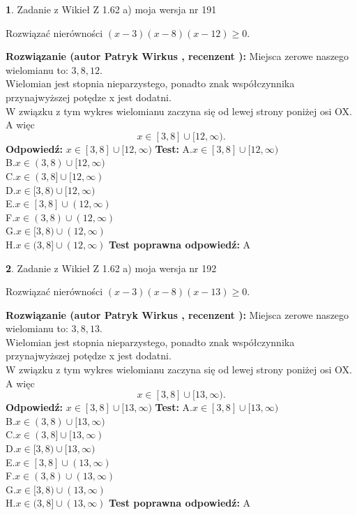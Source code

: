 \documentclass[12pt, a4paper]{article}
\theoremstyle{definition} %
\newtheorem{zad}{}
\newcommand{\zadStart}[1]{\begin{zad}#1\newline}
\newcommand{\zadStop}{\end{zad}}
\newcommand{\rozwStart}[2]{\noindent \textbf{Rozwiązanie (autor #1 , recenzent #2): }\newline}
\newcommand{\rozwStop}{\newline}
\newcommand{\odpStart}{\noindent \textbf{Odpowiedź:}\newline}
\newcommand{\odpStop}{\newline}
\newcommand{\testStart}{\noindent \textbf{Test:}\newline}
\newcommand{\testStop}{\newline}
\newcommand{\kluczStart}{\noindent \textbf{Test poprawna odpowiedź:}\newline}
\newcommand{\kluczStop}{\newline}
\begin{document}
\zadStart{Zadanie z Wikieł Z 1.62 a) moja wersja nr 191}

Rozwiązać nierówności $(x-3)(x-8)(x-12)\ge0$.
\zadStop
\rozwStart{Patryk Wirkus}{}
Miejsca zerowe naszego wielomianu to: $3, 8, 12$.\\
Wielomian jest stopnia nieparzystego, ponadto znak współczynnika przy\linebreak najwyższej potędze x jest dodatni.\\ W związku z tym wykres wielomianu zaczyna się od lewej strony poniżej osi OX. A więc $$x \in [3,8] \cup [12,\infty).$$
\rozwStop
\odpStart
$x \in [3,8] \cup [12,\infty)$
\odpStop
\testStart
A.$x \in [3,8] \cup [12,\infty)$\\
B.$x \in (3,8) \cup [12,\infty)$\\
C.$x \in (3,8] \cup [12,\infty)$\\
D.$x \in [3,8) \cup [12,\infty)$\\
E.$x \in [3,8] \cup (12,\infty)$\\
F.$x \in (3,8) \cup (12,\infty)$\\
G.$x \in [3,8) \cup (12,\infty)$\\
H.$x \in (3,8] \cup (12,\infty)$
\testStop
\kluczStart
A
\kluczStop



\zadStart{Zadanie z Wikieł Z 1.62 a) moja wersja nr 192}

Rozwiązać nierówności $(x-3)(x-8)(x-13)\ge0$.
\zadStop
\rozwStart{Patryk Wirkus}{}
Miejsca zerowe naszego wielomianu to: $3, 8, 13$.\\
Wielomian jest stopnia nieparzystego, ponadto znak współczynnika przy\linebreak najwyższej potędze x jest dodatni.\\ W związku z tym wykres wielomianu zaczyna się od lewej strony poniżej osi OX. A więc $$x \in [3,8] \cup [13,\infty).$$
\rozwStop
\odpStart
$x \in [3,8] \cup [13,\infty)$
\odpStop
\testStart
A.$x \in [3,8] \cup [13,\infty)$\\
B.$x \in (3,8) \cup [13,\infty)$\\
C.$x \in (3,8] \cup [13,\infty)$\\
D.$x \in [3,8) \cup [13,\infty)$\\
E.$x \in [3,8] \cup (13,\infty)$\\
F.$x \in (3,8) \cup (13,\infty)$\\
G.$x \in [3,8) \cup (13,\infty)$\\
H.$x \in (3,8] \cup (13,\infty)$
\testStop
\kluczStart
A
\kluczStop
\end{document}
